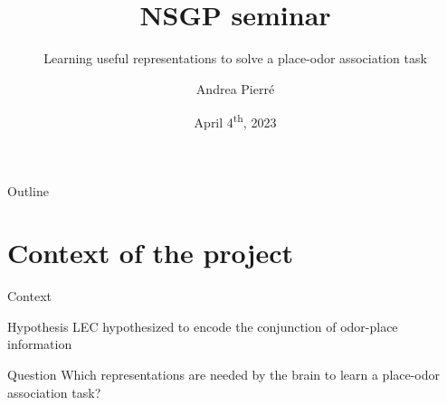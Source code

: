 \documentclass[bigger]{beamer}
\author{Andrea Pierré}
\date{April 4\textsuperscript{th}, 2023}
\title{NSGP seminar}
\subtitle{Learning useful representations to solve a place-odor association task}
\institute{Brown University}
\begin{document}
\maketitle
\begin{frame}[plain]{Outline}
\tableofcontents
\end{frame}

\section{Context of the project}
\label{sec:org004670a}
\begin{frame}[label={sec:orgbd03544}]{Context}
\begin{exampleblock}{Hypothesis}
LEC hypothesized to encode the conjunction of odor-place information
\end{exampleblock}
\pause
{}
\begin{exampleblock}{Question}
Which representations are needed by the brain to learn a place-odor association task?
\end{exampleblock}
\end{frame}
\end{document}
